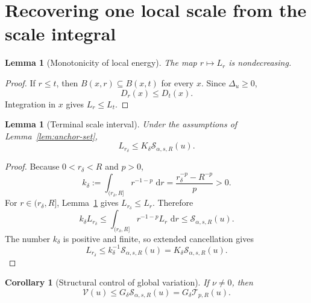 \documentclass[11pt]{article}
\newtheorem{lemma}[theorem]{Lemma}
\newtheorem{corollary}[theorem]{Corollary}
\theoremstyle{remark}
\newcommand{\dd}{\,\mathrm{d}}
\newcommand{\Senergy}{\mathcal S}
\newcommand{\Tenergy}{\mathcal T}
\newcommand{\Venergy}{\mathcal V}
\begin{document}
\section{Recovering one local scale from the scale integral}

\begin{lemma}[Monotonicity of local energy]                               \label{lem:local-monotone}
The map \(r\mapsto L_r\) is nondecreasing.
\end{lemma}

\begin{proof}
If \(r\leq t\), then \(B(x,r)\subseteq B(x,t)\) for every \(x\).  Since
\(\Delta_u\geq0\),
\[
  D_r(x)\leq D_t(x).
\]
Integration in \(x\) gives \(L_r\leq L_t\).
\end{proof}

\begin{lemma}[Terminal scale interval]                                    \label{lem:terminal-scale}
Under the assumptions of Lemma~\ref{lem:anchor-set},
\begin{equation}
  L_{r_\delta}
  \leq
  K_\delta\Senergy_{\alpha,s,R}(u).                                      \label{eq:local-by-scale}
\end{equation}
\end{lemma}

\begin{proof}
Because \(0<r_\delta<R\) and \(p>0\),
\begin{equation}
  k_\delta
  :=
  \int_{(r_\delta,R]}r^{-1-p}\,\dd r
  =
  \frac{r_\delta^{-p}-R^{-p}}p
  >0.                                                                    \label{eq:tail-mass}
\end{equation}
For \(r\in(r_\delta,R]\), Lemma~\ref{lem:local-monotone} gives
\(L_{r_\delta}\leq L_r\).  Therefore
\[
  k_\delta L_{r_\delta}
  \leq
  \int_{(r_\delta,R]}r^{-1-p}L_r\,\dd r
  \leq
  \Senergy_{\alpha,s,R}(u).
\]
The number \(k_\delta\) is positive and finite, so extended cancellation
gives
\[
  L_{r_\delta}
  \leq
  k_\delta^{-1}\Senergy_{\alpha,s,R}(u)
  =
  K_\delta\Senergy_{\alpha,s,R}(u).
\]
\end{proof}

\begin{corollary}[Structural control of global variation]                 \label{cor:global-by-scale}
If \(\nu\neq0\), then
\begin{equation}
  \Venergy(u)
  \leq
  G_\delta\Senergy_{\alpha,s,R}(u)
  =
  G_\delta\Tenergy_{p,R}(u).                                              \label{eq:global-by-truncated}
\end{equation}
\end{corollary}
\end{document}
